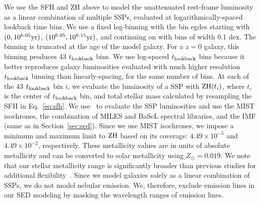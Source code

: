 We use the SFH and ZH above to model the unattenuated rest-frame luminosity as
a linear combination of multiple SSPs, evaluated at logarithmically-spaced
lookback time bins.
We use a fixed log-binning with the bin egdes starting with $(0, 10^{6.05}{\rm
yr})$, $(10^{6.05}, 10^{6.15}{\rm yr})$, and continuing on with bins of width
0.1 dex.
The binning is truncated at the age of the model galaxy. 
For a $z=0$ galaxy, this binning produces 43 $t_{\rm lookback}$ bins.
We use log-spaced $t_{\rm lookback}$ bins because it better reproduces galaxy luminosities
evaluated with much higher resolution $t_{\rm lookback}$ binning than linearly-spacing, for
the same number of bins. 
At each of the 43 $t_{\rm lookback}$ bin $i$, we evaluate the luminosity of a SSP with
${\rm ZH}(t_i)$, where $t_i$ is the center of $t_{\rm lookback}$ bin, and total stellar
mass calculated by resampling the SFH in Eq.~\ref{eq:sfh}. 
We use \fsps~to evaluate the SSP luminosities and use the MIST isochrones, the
combination of MILES and BaSeL spectral libraries, and the \cite{chabrier2003}
IMF (same as in Section~\ref{sec:sed}).  
Since we use MIST isochrones, we impose a minimum and maximum limit to ${\rm
ZH}$ based on its coverage: $4.49\times10^{-5}$ and $4.49\times10^{-2}$,
respectively.
These metallicity values are in units of absolute metallicity and can be
converted to solar metallicity using $Z_\odot = 0.019$. 
We note that our stellar metallicity range is significantly broader than
previous studies for additional flexibility~\citep[\emph{e.g.}][]{leja2017,
carnall2019a, tacchella2021}. 
Since we model galaxies solely as a linear combination of SSPs, we do not
model nebular emission.  
We, therefore, exclude emission lines in our SED modeling by masking the
wavelength ranges of emission lines.

